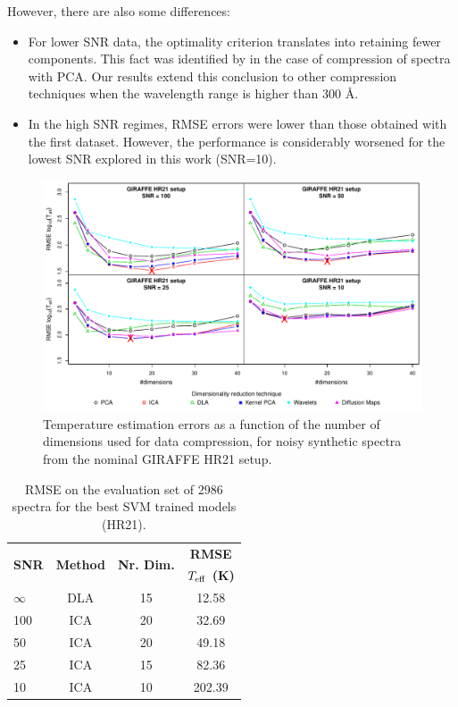 \documentclass[a4paper,fleqn,usenatbib]{mnras}
\begin{document}
{{{However, there are also some differences: 
\begin{itemize}
\item For lower SNR data, the optimality criterion translates into
	retaining fewer components. This fact was identified by 
	\citep{Bailer-Jones1998} in the case of compression of spectra 
	with PCA. Our results extend this conclusion to other compression 
	techniques when the wavelength range is higher than 300 {\AA}.
\item In the high SNR regimes, RMSE errors were lower than those 
	obtained with the first dataset. However, the performance is 
	considerably worsened for the lowest SNR explored in this work 
	(SNR=10).
\end{itemize}


\begin{figure}
\centering\includegraphics[width=.9\textwidth]{flamesHR21_Teff_log_BestSVM_N-RMSE_test.pdf}
\caption{Temperature estimation errors as a function of the number of
  dimensions used for data compression, for noisy synthetic
  spectra from the nominal GIRAFFE HR21 setup.}
\label{fig:02hr21}
\end{figure}


\begin{table}
\centering
\caption{RMSE on the evaluation set of 2986 spectra for the best SVM trained models (HR21).}
\label{tab:hr21}
\begin{tabular}{l c c c}
\hline
\multirow{2}{*}{\textbf{SNR}} & \multirow{2}{*}{\textbf{Method}} & \multirow{2}{*}{\textbf{Nr. Dim.}} & {\bf RMSE}\\
 &  &  & \textbf{$T_{\rm eff}$ (K)}\\
\hline
$\infty$ & DLA & 15 & 12.58\\
100 & ICA & 20 & 32.69\\
50 & ICA & 20 & 49.18\\
25 & ICA & 15 & 82.36\\
10 & ICA & 10 & 202.39\\
\hline
\end{tabular}
\end{table}

}}}
\end{document}
